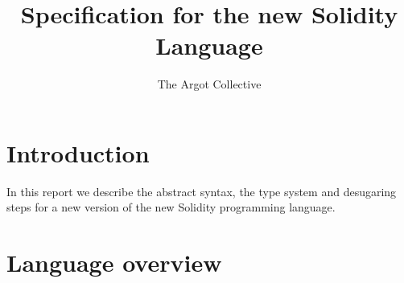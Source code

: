 \documentclass[a4paper, 11pt]{article}
\title{Specification for the new Solidity Language}
\author{The Argot Collective}
\begin{document}
\maketitle

\lstset{
  language=solidity,
  basicstyle=\ttfamily\small,
  keywordstyle=\bfseries,
}



\newcommand{\word}{\ensuremath{\mathtt{word}}}
\newcommand{\unit}{\ensuremath{\mathtt{unit}}}
\newcommand{\typing}[1]{\ensuremath{\overset{\text{\tiny{#1}}}{\vdash}}}
\newcommand{\cc}{\ensuremath{\overset{\text{cc}}}{\leadsto}}
\newcommand{\inst}{\ensuremath{\sqsubseteq}}
\newcommand{\invoke}{\ensuremath{\mathtt{Invokable.invoke}}}
\newcommand{\invokable}{\ensuremath{\mathtt{Invokable}}}
\newcommand{\dom}[1]{\ensuremath{\mathtt{dom}(#1)}}
\newcommand{\id}{\ensuremath{\mathtt{id}}}
\newcommand{\ftv}{\ensuremath{\mathtt{ftv}}}
\newcommand{\fpv}{\ensuremath{\mathtt{fpv}}} 
\newcommand{\closuretype}{\ensuremath{\overset{\tiny{ctype}}{\leadsto}}}
\newcommand{\sig}{\ensuremath{\overset{\tiny{sig}}{\leadsto}}}
\newcommand{\unique}{\ensuremath{\overset{\tiny{unique}}{\leadsto}}}
\newcommand{\geninvoke}{\ensuremath{\overset{\tiny{gen}}{\leadsto}}}
\newcommand{\sats}[3]{\Theta ; #3 \vdash^{\mathtt{sats}} #1 \leadsto #2}
\newcommand{\mgu}{\ensuremath{\mathtt{mgu}}}
\newcommand{\reduce}{\vdash^{\mathtt{red}}}
\newcommand{\simp}{\vdash^{\mathtt{simp}}}
\newcommand{\impr}{\vdash^{\mathtt{impr}}}
\newcommand{\solidity}{new Solidity } 


\section{Introduction}\label{sec:introduction}

In this report we describe the abstract syntax, 
the type system and desugaring steps for a new 
version of the \solidity programming language.

\section{Language overview} 
\end{document}
